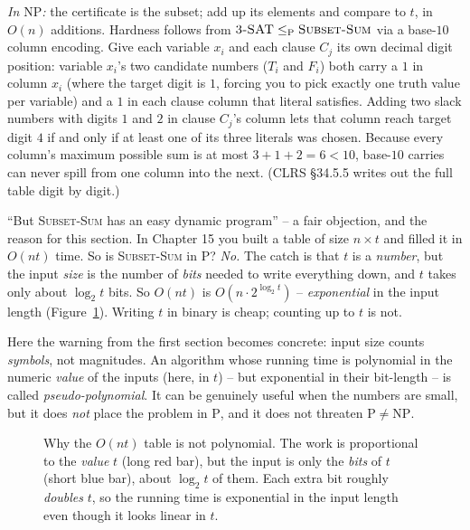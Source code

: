 \emph{In $\mathrm{NP}$:} the certificate is the subset; add up its elements and
compare to $t$, in $O(n)$ additions. Hardness follows from
$\textsc{3-SAT}\le_{\mathrm{P}}\textsc{Subset-Sum}$ via a base-$10$ column encoding.
Give each variable $x_i$ and each clause $C_j$ its own decimal digit position:
variable $x_i$'s two candidate numbers ($T_i$ and $F_i$) both carry a $1$ in column
$x_i$ (where the target digit is $1$, forcing you to pick exactly one truth value per
variable) and a $1$ in each clause column that literal satisfies. Adding two slack
numbers with digits $1$ and $2$ in clause $C_j$'s column lets that column reach target
digit $4$ if and only if at least one of its three literals was chosen. Because
every column's maximum possible sum is at most $3 + 1 + 2 = 6 < 10$, base-$10$ carries
can never spill from one column into the next. (CLRS \S34.5.5 writes out the full table
digit by digit.)

\begin{trapbox}
``But \textsc{Subset-Sum} has an easy dynamic program'' -- a fair objection, and
the reason for this section. In Chapter 15 you built a table
of size $n\times t$ and filled it in $O(nt)$ time. So is \textsc{Subset-Sum} in
$\mathrm{P}$? \emph{No.} The catch is that $t$ is a \emph{number}, but the input
\emph{size} is the number of \emph{bits} needed to write everything down, and $t$
takes only about $\log_2 t$ bits. So $O(nt)$ is $O(n\cdot 2^{\log_2 t})$ --
\emph{exponential} in the input length (Figure~\ref{ch33:pseudo-fig}). Writing
$t$ in binary is cheap; counting up to $t$ is not.
\end{trapbox}

Here the warning from the first section becomes concrete: input size
counts \emph{symbols}, not magnitudes. An algorithm whose running time is
polynomial in the numeric \emph{value} of the inputs (here, in $t$) -- but
exponential in their bit-length -- is called \emph{pseudo-polynomial}. It can be
genuinely useful when the numbers are small, but it does \emph{not} place the
problem in $\mathrm{P}$, and it does not threaten $\mathrm{P}\ne\mathrm{NP}$.

\begin{figure}[h]
\centering
{}
\caption{Why the $O(nt)$ table is not polynomial. The work is proportional to the
\emph{value} $t$ (long red bar), but the input is only the \emph{bits} of $t$
(short blue bar), about $\log_2 t$ of them. Each extra bit roughly \emph{doubles}
$t$, so the running time is exponential in the input length even though it looks
linear in $t$.}
\label{ch33:pseudo-fig}
\end{figure}

